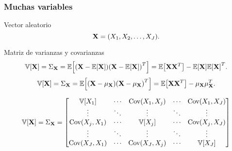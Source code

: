 \documentclass[table]{beamer}
\begin{document}
\begin{frame}
    \frametitle{Muchas variables}
    \begin{block}{Vector aleatorio}
        \begin{equation*}
            \Xvec = \parens{X_{1}, X_{2}, \ldots , X_{J}} .
        \end{equation*}
    \end{block}
    \begin{block}{Matriz de varianzas y covarianzas}
        \begin{equation*}
            \variance{\Xvec} = \Sigma_{\Xvec} = \expected{\parens{\Xvec - \expected{\Xvec}} \parens{\Xvec - \expected{\Xvec}}^{T}} = \expected{\Xvec \Xvec^{T}} - \expected{\Xvec} \expected{\Xvec}^{T} .
        \end{equation*}
        \begin{equation*}
            \variance{\Xvec} = \Sigma_{\Xvec} = \expected{\parens{\Xvec - \mu_{\Xvec}} \parens{\Xvec - \mu_{\Xvec}}^{T}} = \expected{\Xvec \Xvec^{T}} - \mu_{\Xvec} \mu_{\Xvec}^{T} .
        \end{equation*}
    \end{block}
    \begin{equation*}
        \variance{\Xvec} = \Sigma_{\Xvec} =
        \begin{bmatrix}
            \variance{X_{1}} & \cdots & \cov{X_{1} , X_{j}} & \cdots & \cov{X_{1} , X_{J}} \\
            \vdots & \ddots & \vdots & \ddots & \vdots \\
            \cov{X_{j} , X_{1}} & \cdots & \variance{X_{j}} & \cdots & \cov{X_{j} , X_{J}} \\
            \vdots & \ddots & \vdots & \ddots & \vdots \\
            \cov{X_{J} , X_{1}} & \cdots & \cov{X_{J} , X_{j}} & \cdots & \variance{X_{J}} \\
        \end{bmatrix}
    \end{equation*}
\end{frame}
\end{document}
